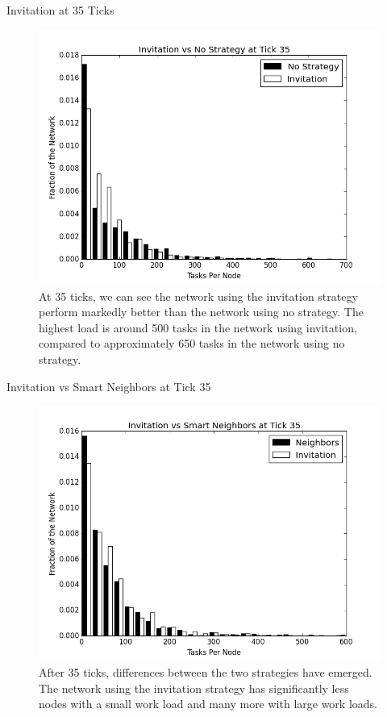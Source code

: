 \documentclass[11pt]{beamer}
\begin{document}
\begin{frame}{Invitation at 35 Ticks}
\begin{figure}
	\centering
	\includegraphics[width=0.7\linewidth]{figs/inviteStableHist35}
	\caption[Invitiation vs no strategy after 35 ticks]{At 35 ticks, we can see the network using the invitation strategy perform markedly better than the network using no strategy. The highest load is around 500 tasks in the network using invitation, compared to approximately 650 tasks in the network using no strategy.}
	\label{fig:inviteStableHist35}
\end{figure}
\end{frame}




\begin{frame}{Invitation vs Smart Neighbors at Tick 35}

\begin{figure}
	\centering
	\includegraphics[width=0.7\linewidth]{figs/inviteNeighborsHist35}
	\caption[Invitation vs smart neighbor injection after 35 ticks.]{After 35 ticks, differences between the two strategies have emerged.  The network using the invitation strategy has significantly less nodes with a small work load and many more with large work loads.}
	\label{fig:inviteNeighborsHist35}
\end{figure}

\end{frame}
\end{document}
